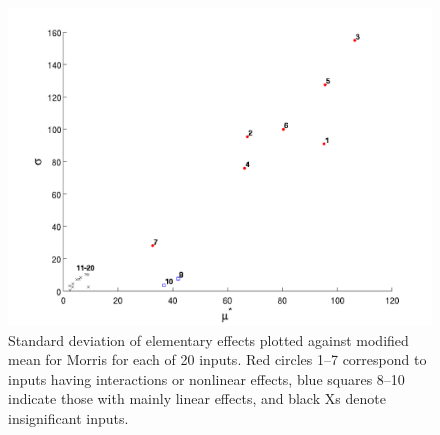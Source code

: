 \begin{figure}[ht!]
\centering
\includegraphics[width=\textwidth]{images/moat_mustar_sigma}
\caption{\label{FIG:mustar_sigma} Standard deviation of elementary
effects plotted against modified mean for Morris for each of 20
inputs. Red circles 1--7 correspond to inputs having interactions or
nonlinear effects, blue squares 8--10 indicate those with mainly
linear effects, and black Xs denote insignificant inputs.}
\end{figure}
